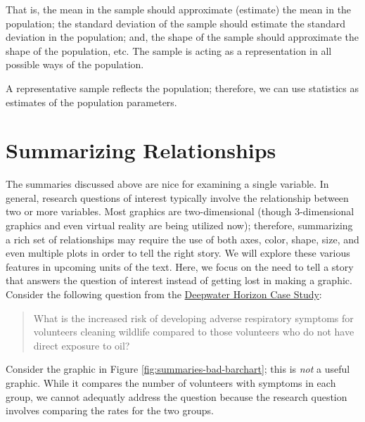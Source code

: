 \documentclass[]{book}
\theoremstyle{definition}
\theoremstyle{definition}
\theoremstyle{definition}
\theoremstyle{remark}
\let\BeginKnitrBlock\begin \let\EndKnitrBlock\end
\begin{document}
That is, the mean in the sample should approximate (estimate) the mean
in the population; the standard deviation of the sample should estimate
the standard deviation in the population; and, the shape of the sample
should approximate the shape of the population, etc. The sample is
acting as a representation in all possible ways of the population.

\BeginKnitrBlock{rmdkeyidea}
A representative sample reflects the population; therefore, we can use
statistics as estimates of the population parameters.
\EndKnitrBlock{rmdkeyidea}

\section{Summarizing Relationships}\label{summarizing-relationships}

The summaries discussed above are nice for examining a single variable.
In general, research questions of interest typically involve the
relationship between two or more variables. Most graphics are
two-dimensional (though 3-dimensional graphics and even virtual reality
are being utilized now); therefore, summarizing a rich set of
relationships may require the use of both axes, color, shape, size, and
even multiple plots in order to tell the right story. We will explore
these various features in upcoming units of the text. Here, we focus on
the need to tell a story that answers the question of interest instead
of getting lost in making a graphic. Consider the following question
from the \protect\hyperlink{CaseDeepwater}{Deepwater Horizon Case
Study}:

\begin{quote}
What is the increased risk of developing adverse respiratory symptoms
for volunteers cleaning wildlife compared to those volunteers who do not
have direct exposure to oil?
\end{quote}

Consider the graphic in Figure \ref{fig:summaries-bad-barchart}; this is
\emph{not} a useful graphic. While it compares the number of volunteers
with symptoms in each group, we cannot adequatly address the question
because the research question involves comparing the rates for the two
groups.
\end{document}
